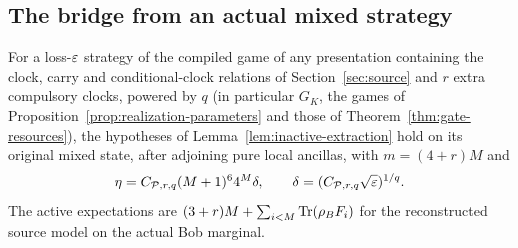 \subsection{The bridge from an actual mixed strategy}
\begin{proposition}\label{prop:actual-state-bridge}
For a loss-$\varepsilon$ strategy of the compiled game of any presentation containing the clock, carry and conditional-clock relations of Section~\ref{sec:source} and $r$ extra compulsory clocks, powered by $q$ (in particular $G_K$, the games of Proposition~\ref{prop:realization-parameters} and those of Theorem~\ref{thm:gate-resources}), the hypotheses of Lemma~\ref{lem:inactive-extraction} hold on its original mixed state, after adjoining pure local ancillas, with $m=(4+r)M$ and
\begin{equation}\label{eq:actual-eta}
 \eta=C_{\mathcal P,r,q}(M+1)^64^M\delta,\qquad
 \delta=(C_{\mathcal P,r,q}\sqrt{\varepsilon})^{1/q}.
\end{equation}
The active expectations are $(3+r)M+\sum_{i<M}\operatorname{Tr}(\rho_BF_i)$ for the reconstructed source model on the actual Bob marginal.
\end{proposition}
